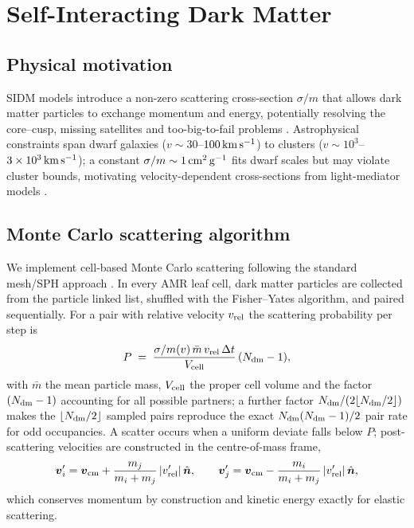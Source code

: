 \documentclass[11pt,a4paper]{article}
\newcommand{\kms}{\,{\rm km\,s^{-1}}}
\begin{document}
\section{Self-Interacting Dark Matter}
\label{sec:sidm}

\subsection{Physical motivation}

SIDM models introduce a non-zero scattering cross-section
$\sigma/m$ that allows dark matter particles to exchange momentum
and energy, potentially resolving the core--cusp, missing
satellites and too-big-to-fail problems
\citep{SpergelSteinhardt2000,TulinYu2018}. Astrophysical
constraints span dwarf galaxies ($v\sim30$--$100\kms$) to clusters
($v\sim10^3$--$3\times10^3\kms$); a constant
$\sigma/m\sim1\,{\rm cm^2\,g^{-1}}$ fits dwarf scales but may
violate cluster bounds, motivating velocity-dependent
cross-sections from light-mediator models
\citep{Feng2009,Tulin2013,Kaplinghat2016}.

\subsection{Monte Carlo scattering algorithm}

We implement cell-based Monte Carlo scattering following the
standard mesh/SPH approach \citep{Rocha2013,Robertson2017}. In
every AMR leaf cell, dark matter particles are collected from the
particle linked list, shuffled with the Fisher--Yates algorithm,
and paired sequentially. For a pair with relative velocity
$v_{\rm rel}$ the scattering probability per step is
\begin{equation}
P \;=\; \frac{\sigma/m(v)\,\bar m\,v_{\rm rel}\,\Delta t}
             {V_{\rm cell}}\,(N_{\rm dm}-1),
\label{eq:sidm_prob}
\end{equation}
with $\bar m$ the mean particle mass, $V_{\rm cell}$ the proper
cell volume and the factor $(N_{\rm dm}-1)$ accounting for all
possible partners; a further factor
$N_{\rm dm}/(2\lfloor N_{\rm dm}/2\rfloor)$ makes the
$\lfloor N_{\rm dm}/2\rfloor$ sampled pairs reproduce the exact
$N_{\rm dm}(N_{\rm dm}-1)/2$ pair rate for odd occupancies. A scatter occurs when a uniform deviate falls
below $P$; post-scattering velocities are constructed in the
centre-of-mass frame,
\begin{equation}
\boldsymbol{v}'_{i} = \boldsymbol{v}_{\rm cm}
 + \frac{m_j}{m_i+m_j}\,|v'_{\rm rel}|\,\hat{\boldsymbol{n}},\qquad
\boldsymbol{v}'_{j} = \boldsymbol{v}_{\rm cm}
 - \frac{m_i}{m_i+m_j}\,|v'_{\rm rel}|\,\hat{\boldsymbol{n}},
\end{equation}
which conserves momentum by construction and kinetic energy
exactly for elastic scattering.
\end{document}

